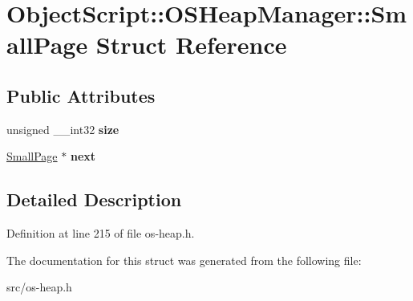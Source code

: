 \hypertarget{struct_object_script_1_1_o_s_heap_manager_1_1_small_page}{}\section{Object\+Script\+:\+:O\+S\+Heap\+Manager\+:\+:Small\+Page Struct Reference}
\label{struct_object_script_1_1_o_s_heap_manager_1_1_small_page}
\subsection*{Public Attributes}
\begin{DoxyCompactItemize}
\item 
unsigned \+\_\+\+\_\+int32 {\bfseries size}\hypertarget{struct_object_script_1_1_o_s_heap_manager_1_1_small_page_a25c29643322ab472d81c0ce124078fcb}{}\label{struct_object_script_1_1_o_s_heap_manager_1_1_small_page_a25c29643322ab472d81c0ce124078fcb}

\item 
\hyperlink{struct_object_script_1_1_o_s_heap_manager_1_1_small_page}{Small\+Page} $\ast$ {\bfseries next}\hypertarget{struct_object_script_1_1_o_s_heap_manager_1_1_small_page_a0203799ce6296b527236fe24d2b9ab9c}{}\label{struct_object_script_1_1_o_s_heap_manager_1_1_small_page_a0203799ce6296b527236fe24d2b9ab9c}

\end{DoxyCompactItemize}


\subsection{Detailed Description}


Definition at line 215 of file os-\/heap.\+h.



The documentation for this struct was generated from the following file\+:\begin{DoxyCompactItemize}
\item 
src/os-\/heap.\+h\end{DoxyCompactItemize}
